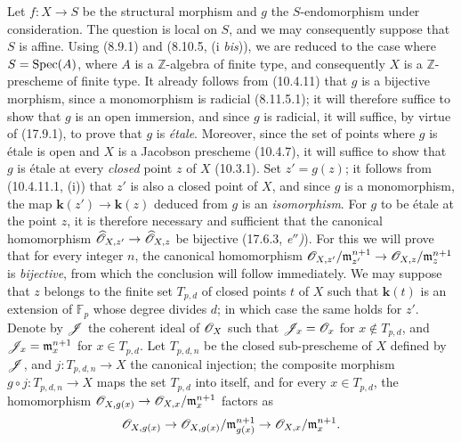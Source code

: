Let $f:X\to S$ be the structural morphism and $g$ the $S$-endomorphism under consideration. The question is local on $S$, and we may consequently suppose that $S$ is affine. Using (8.9.1) and (8.10.5, (i \emph{bis})), we are reduced to the case where $S=\operatorname{Spec}(A)$, where $A$ is a $\mathbb{Z}$-algebra of finite type, and consequently $X$ is a $\mathbb{Z}$-prescheme of finite type. It already follows from (10.4.11) that $g$ is a bijective morphism, since a monomorphism is radicial (8.11.5.1); it will therefore suffice to show
that $g$ is an open immersion, and since $g$ is radicial, it will suffice, by virtue of (17.9.1), to prove that $g$ is \emph{étale}. Moreover, since the set of points where $g$ is étale is open and $X$ is a Jacobson prescheme (10.4.7), it will suffice to show that $g$ is étale at every \emph{closed} point $z$ of $X$ (10.3.1). Set $z'=g(z)$; it follows from (10.4.11.1, (i)) that $z'$ is also a closed point of $X$, and since $g$ is a monomorphism, the map $\boldsymbol{k}(z')\to\boldsymbol{k}(z)$ deduced from $g$ is an \emph{isomorphism}. For $g$ to be étale at the point $z$, it is therefore necessary and sufficient that the canonical homomorphism $\widehat{\mathscr{O}}_{X,z'}\to\widehat{\mathscr{O}}_{X,z}$ be bijective (17.6.3, \emph{e$''$)}). For this we will prove that for every integer $n$, the canonical homomorphism $\mathscr{O}_{X,z'}/\mathfrak m_{z'}^{n+1}\to\mathscr{O}_{X,z}/\mathfrak m_z^{n+1}$ is \emph{bijective}, from which the conclusion will follow immediately. We may suppose that $z$ belongs to the finite set $T_{p,d}$ of closed points $t$ of $X$ such that $\boldsymbol{k}(t)$ is an extension of $\mathbb{F}_p$ whose degree divides $d$; in which case the same holds for $z'$. Denote by $\mathscr{J}$ the coherent ideal of $\mathscr{O}_X$ such that $\mathscr{J}_x=\mathscr{O}_x$ for $x\notin T_{p,d}$, and $\mathscr{J}_x=\mathfrak m_x^{n+1}$ for $x\in T_{p,d}$. Let $T_{p,d,n}$ be the closed sub-prescheme of $X$ defined by $\mathscr{J}$, and $j:T_{p,d,n}\to X$ the canonical injection; the composite morphism $g\circ j:T_{p,d,n}\to X$ maps the set $T_{p,d}$ into itself, and for every $x\in T_{p,d}$, the homomorphism $\mathscr{O}_{X,g(x)}\to\mathscr{O}_{X,x}/\mathfrak m_x^{n+1}$ factors as
\[
\mathscr{O}_{X,g(x)}\to\mathscr{O}_{X,g(x)}/\mathfrak m_{g(x)}^{n+1}\to\mathscr{O}_{X,x}/\mathfrak m_x^{n+1}.
\]
